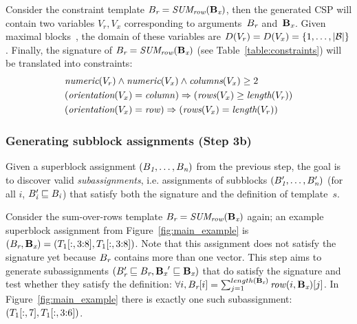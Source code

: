 \begin{example}

  Consider the constraint template $B_{\textit{r}} = \textit{SUM\textsubscript{row}}(\mathbf{B_{\textit{x}}})$, then the generated CSP will contain two variables $V_r, V_x$ corresponding to arguments~$B_{\textit{r}}$ and~$\mathbf{B_{\textit{x}}}$.
  Given maximal blocks~\blocks, the domain of these variables are $D(V_r) = D(V_x) = \{ 1, \dots, |\mathcal{B}| \}$.
  Finally, the signature of $B_{\textit{r}} = \textit{SUM\textsubscript{row}}(\mathbf{B_{\textit{x}}})$ (see Table~\ref{table:constraints}) will be translated into constraints:
  \begin{align*}
    & \textit{numeric}(V_r) \land \textit{numeric}(V_x) \land \textit{columns}(V_x) \geq 2 \\
    & (\textit{orientation}(V_x) = \mathit{column}) \Rightarrow (\textit{rows}(V_x) \geq \textit{length}(V_r)) \\
    & (\textit{orientation}(V_x) = \mathit{row}) \Rightarrow (\textit{rows}(V_x) = \textit{length}(V_r))
  \end{align*}
\end{example}





\subsubsection{Generating subblock assignments (Step 3b)}
\label{sec:algo:subgr}

Given a superblock assignment $(B_{\textit{1}}, \dots, B_{\textit{n}})$ from the previous step, the goal is to discover valid \textit{subassignments}, i.e. assignments of subblocks $(B'_{\textit{1}}, \dots, B'_{\textit{n}})$ (for all $i$, $B'_{\textit{i}} \sqsubseteq B_{\textit{i}}$) that satisfy both the signature and the definition of template~$s$.

\begin{example}
  Consider the sum-over-rows template $B_{\textit{r}} = \textit{SUM\textsubscript{row}}(\mathbf{B_{\textit{x}}})$ again;
  an example superblock assignment from Figure~\ref{fig:main_example} is $(B_{\textit{r}}, \mathbf{B_{\textit{x}}}) = (T_1[:,3{:}8], T_1[:,3{:}8])$.
  Note that this assignment does not satisfy the signature yet because $B_{\textit{r}}$ contains more than one vector.
  This step aims to generate subassignments $(B_{\textit{r}}' \sqsubseteq B_{\textit{r}}, \mathbf{B_{\textit{x}}}' \sqsubseteq \mathbf{B_{\textit{x}}})$ that do satisfy the signature and test whether they satisfy the definition:
  $\forall i, B_{\textit{r}}[i] = \sum_{j = 1}^{length(\mathbf{B_{\textit{x}}})} \mathit{row}(i, \mathbf{B_{\textit{x}}})[j]$.
  In Figure~\ref{fig:main_example} there is exactly one such subassignment: $(T_1[:,7], T_1[:,3{:}6])$.
\end{example}


